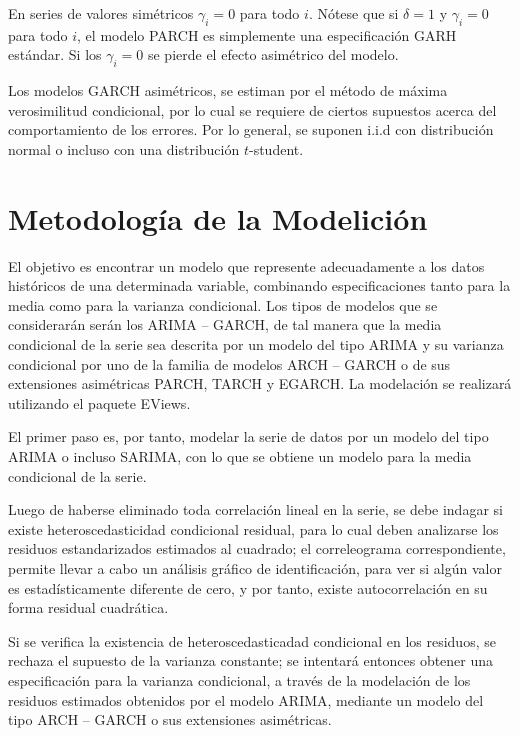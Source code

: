 En series de valores sim\'{e}tricos $\gamma_{i}=0$ para todo $i$. N\'{o}tese que si $\delta =1$ y $\gamma_{i}=0$ para todo $i$, el modelo PARCH es simplemente una especificaci\'{o}n GARH est\'{a}ndar. Si los $\gamma_{i}=0$ se pierde el efecto asim\'{e}trico del modelo.\newline

Los modelos GARCH asim\'{e}tricos, se estiman por el m\'{e}todo de m\'{a}xima verosimilitud condicional, por lo cual se requiere de ciertos supuestos acerca del comportamiento de los errores. Por lo general, se suponen i.i.d con distribuci\'{o}n normal o incluso con una distribuci\'{o}n $t$-student.

\section{Metodolog\'ia de la Modelici\'on}

El objetivo es encontrar un modelo que represente adecuadamente a los datos hist\'{o}ricos de una determinada variable, combinando especificaciones tanto para la media como para la varianza condicional. Los tipos de modelos que se considerar\'{a}n ser\'{a}n los ARIMA -- GARCH, de tal manera que la media condicional de la serie sea descrita por un modelo del tipo ARIMA y su varianza condicional por uno de la familia de modelos ARCH -- GARCH o de sus extensiones asim\'{e}tricas PARCH, TARCH y EGARCH. La modelaci\'{o}n se realizar\'{a} utilizando el paquete EViews.\newline

El primer paso es, por tanto, modelar la serie de datos por un modelo del tipo ARIMA o incluso SARIMA, con lo que se obtiene un modelo para la media condicional de la serie.\newline

Luego de haberse eliminado toda correlaci\'{o}n lineal en la serie, se debe indagar si existe heteroscedasticidad condicional residual, para lo cual deben analizarse los residuos estandarizados estimados al cuadrado; el correleograma correspondiente, permite llevar a cabo un an\'{a}lisis gr\'{a}fico de identificaci\'{o}n, para ver si alg\'{u}n valor es estad\'{i}sticamente diferente de cero, y por tanto, existe autocorrelaci\'{o}n en su forma residual cuadr\'{a}tica.\newline

Si se verifica la existencia de heteroscedasticadad condicional en los residuos, se rechaza el supuesto de la varianza constante; se intentar\'{a} entonces obtener una especificaci\'{o}n para la varianza condicional, a trav\'{e}s de la modelaci\'{o}n de los residuos estimados obtenidos por el modelo ARIMA, mediante un modelo del tipo ARCH -- GARCH o sus extensiones asim\'{e}tricas.\newline

